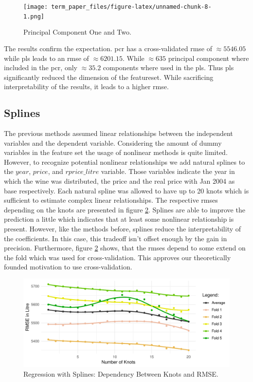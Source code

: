 \documentclass[11pt,]{article}
\begin{document}
\begin{figure}
\centering
\texttt{[image: term\_paper\_files/figure-latex/unnamed-chunk-8-1.png]}
\caption{\label{fig:PrincCom}Principal Component One and Two.}
\end{figure}

The results confirm the expectation. \ac{pcr} has a cross-validated
\ac{rmse} of \(\approx 5546.05\) while \ac{pls} leads to an \ac{rmse} of
\(\approx 6201.15\). While \(\approx 635\) principal component where
included in the \ac{pcr}, only \(\approx 35.2\) components where used in
the \ac{pls}. Thus \ac{pls} significantly reduced the dimension of the
featureset. While sacrificing interpretability of the results, it leads
to a higher \ac{rmse}.

\hypertarget{splines}{%
\subsection{Splines}\label{splines}}

The previous methods assumed linear relationships between the
independent variables and the dependent variable. Considering the amount
of dummy variables in the feature set the usage of nonlinear methods is
quite limited. However, to recognize potential nonlinear relationships
we add natural splines to the \(year\), \(price\), and \(rprice\_litre\)
variable. Those variables indicate the year in which the wine was
distributed, the price and the real price with Jan 2004 as base
respectively. Each natural spline was allowed to have up to 20 knots
which is sufficient to estimate complex linear relationships. The
respective \ac{rmse}s depending on the knots are presented in figure
\ref{fig:splines}. Splines are able to improve the prediction a little
which indicates that at least some nonlinear relationship is present.
However, like the methods before, splines reduce the interpretability of
the coefficients. In this case, this tradeoff isn't offset enough by the
gain in precision. Furthermore, figure \ref{fig:splines} shows, that the
\ac{rmse}s depend to some extend on the fold which was used for
cross-validation. This approves our theoretically founded motivation to
use cross-validation.

\begin{figure}

\includegraphics{../00_data/output_paper/08_splines} \hfill{}

\caption[RMSE Values of Different Spline Models]{\label{fig:splines}Regression with Splines: Dependency Between Knots and RMSE.}\label{fig:splines}
\end{figure}
\end{document}
